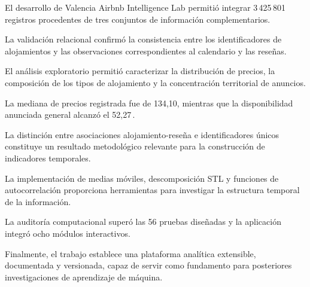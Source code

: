 \documentclass[11pt,a4paper]{article}
\begin{document}
El desarrollo de Valencia Airbnb Intelligence Lab
permitió integrar 3\,425\,801 registros procedentes
de tres conjuntos de información complementarios.

La validación relacional confirmó la consistencia
entre los identificadores de alojamientos y las
observaciones correspondientes al calendario
y las reseñas.

El análisis exploratorio permitió caracterizar
la distribución de precios, la composición de
los tipos de alojamiento y la concentración
territorial de anuncios.

La mediana de precios registrada fue de 134,10,
mientras que la disponibilidad anunciada general
alcanzó el 52,27\,.

La distinción entre asociaciones alojamiento-reseña
e identificadores únicos constituye un resultado
metodológico relevante para la construcción
de indicadores temporales.

La implementación de medias móviles, descomposición
STL y funciones de autocorrelación proporciona
herramientas para investigar la estructura temporal
de la información.

La auditoría computacional superó las 56 pruebas
diseñadas y la aplicación integró ocho módulos
interactivos.

Finalmente, el trabajo establece una plataforma
analítica extensible, documentada y versionada,
capaz de servir como fundamento para posteriores
investigaciones de aprendizaje de máquina.


\clearpage
\end{document}
